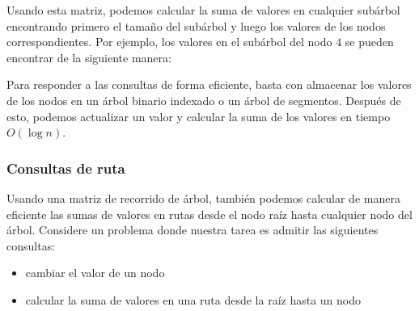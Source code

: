 Usando esta matriz, podemos calcular la suma de valores
en cualquier subárbol encontrando primero el tamaño del subárbol
y luego los valores de los nodos correspondientes.
Por ejemplo, los valores en el subárbol del nodo $4$
se pueden encontrar de la siguiente manera:

\begin{center}
\end{center}

Para responder a las consultas de forma eficiente,
basta con almacenar los valores de los
nodos en un árbol binario indexado o un árbol de segmentos.
Después de esto, podemos actualizar un valor
y calcular la suma de los valores en tiempo $O(\log n)$.

\subsubsection{Consultas de ruta}

Usando una matriz de recorrido de árbol, también podemos calcular de manera eficiente
las sumas de valores en
rutas desde el nodo raíz hasta cualquier
nodo del árbol.
Considere un problema donde nuestra tarea
es admitir las siguientes consultas:
\begin{itemize}
\item cambiar el valor de un nodo
\item calcular la suma de valores en una ruta desde
la raíz hasta un nodo
\end{itemize}

